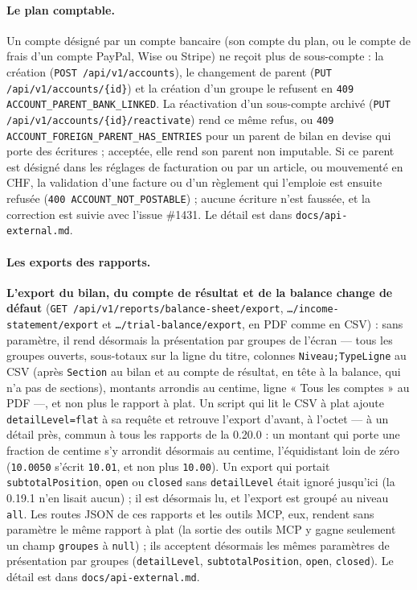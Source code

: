 \documentclass[a4paper,11pt,oneside]{article}
\begin{document}
\paragraph{Le plan comptable.} Un compte désigné par un compte bancaire (son compte du plan, ou le compte de frais d'un compte PayPal, Wise ou Stripe) ne reçoit plus de sous-compte : la création (\texttt{POST /api/v1/\allowbreak accounts}), le changement de parent (\texttt{PUT /api/v1/\allowbreak accounts/\allowbreak\{id\}}) et la création d'un groupe le refusent en \texttt{409 ACCOUNT\_PARENT\_BANK\_LINKED}. La réactivation d'un sous-compte archivé (\texttt{PUT /api/v1/\allowbreak accounts/\allowbreak\{id\}/\allowbreak reactivate}) rend ce même refus, ou \texttt{409 ACCOUNT\_FOREIGN\_PARENT\_HAS\_ENTRIES} pour un parent de bilan en devise qui porte des écritures ; acceptée, elle rend son parent non imputable. Si ce parent est désigné dans les réglages de facturation ou par un article, ou mouvementé en CHF, la validation d'une facture ou d'un règlement qui l'emploie est ensuite refusée (\texttt{400 ACCOUNT\_NOT\_POSTABLE}) ; aucune écriture n'est faussée, et la correction est suivie avec l'issue \#1431. Le détail est dans \texttt{docs/api-external.md}.

\paragraph{Les exports des rapports.} \textbf{L'export du bilan, du compte de résultat et de la balance change de défaut} (\texttt{GET /api/v1/\allowbreak reports/\allowbreak balance-sheet/\allowbreak export}, \texttt{\ldots/income-statement/\allowbreak export} et \texttt{\ldots/trial-balance/\allowbreak export}, en PDF comme en CSV) : sans paramètre, il rend désormais la présentation par groupes de l'écran --- tous les groupes ouverts, sous-totaux sur la ligne du titre, colonnes \texttt{Niveau;TypeLigne} au CSV (après \texttt{Section} au bilan et au compte de résultat, en tête à la balance, qui n'a pas de sections), montants arrondis au centime, ligne « Tous les comptes » au PDF ---, et non plus le rapport à plat. Un script qui lit le CSV à plat ajoute \texttt{detailLevel=flat} à sa requête et retrouve l'export d'avant, à l'octet --- à un détail près, commun à tous les rapports de la 0.20.0 : un montant qui porte une fraction de centime s'y arrondit désormais au centime, l'équidistant loin de zéro (\texttt{10.0050} s'écrit \texttt{10.01}, et non plus \texttt{10.00}). Un export qui portait \texttt{subtotalPosition}, \texttt{open} ou \texttt{closed} sans \texttt{detailLevel} était ignoré jusqu'ici (la 0.19.1 n'en lisait aucun) ; il est désormais lu, et l'export est groupé au niveau \texttt{all}. Les routes JSON de ces rapports et les outils MCP, eux, rendent sans paramètre le même rapport à plat (la sortie des outils MCP y gagne seulement un champ \texttt{groupes} à \texttt{null}) ; ils acceptent désormais les mêmes paramètres de présentation par groupes (\texttt{detailLevel}, \texttt{subtotalPosition}, \texttt{open}, \texttt{closed}). Le détail est dans \texttt{docs/api-external.md}.
\end{document}

